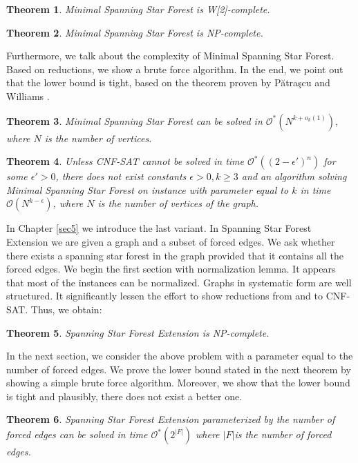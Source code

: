 \documentclass[en]{pracamgr}
\newtheorem{theorem}{Theorem}
\theoremstyle{definition}
\newcommand{\mssfp}{{\sc Minimal Spanning Star Forest}}
\newcommand{\ssfep}{{\sc Spanning Star Forest Extension}}
\newcommand{\cnfsat}{{\sc CNF-SAT}}
\begin{document}
\begin{theorem}\label{thm-mssfp-w2c}
	\mssfp{} is \textup{W[2]}-complete.
\end{theorem}

\begin{theorem}\label{thm-mssfp-npc}
	\mssfp{} is \textup{NP-complete}.
\end{theorem}

\noindent
Furthermore, we talk about the complexity of \mssfp{}. Based on reductions, we show a brute force algorithm. In the end, we point out that the lower bound is tight, based on the theorem proven by Pătraşcu and Williams \cite{DomSet}. 

\begin{theorem}\label{thm-mssfp-time}
	\mssfp{} can be solved in $\mathcal{O}^*(N^{k + o_k(1)})$, where $N$ is the number of vertices.
\end{theorem}

\begin{theorem}\label{thm-mssfp-lowerbound}
	Unless \cnfsat{} cannot be solved in time $\mathcal{O}^*((2-\epsilon')^n)$ for some $\epsilon' > 0$, there does not exist constants $\epsilon > 0,k\geq 3$ and an algorithm solving \mssfp{} on instance with parameter equal to $k$ in time $\mathcal{O}(N^{k-\epsilon})$, where $N$ is the number of vertices of the graph.
\end{theorem}

In Chapter \ref{sec5} we introduce the last variant. In \ssfep{} we are given a graph and a subset of forced edges. We ask whether there exists a spanning star forest in the graph provided that it contains all the forced edges. We begin the first section with normalization lemma. It appears that most of the instances can be normalized. Graphs in systematic form are well structured. It significantly lessen the effort to show reductions from and to \cnfsat{}. Thus, we obtain:

\begin{theorem}\label{thm-ssfep-npc}
	\ssfep{} is \textup{NP}-complete.
\end{theorem}

\noindent
In the next section, we consider the above problem with a parameter equal to the number of forced edges. We prove the lower bound stated in the next theorem by showing a simple brute force algorithm. Moreover, we show that the lower bound is tight and plausibly, there does not exist a better one.

\begin{theorem}\label{thm-ssfep-fe-time}
	\ssfep{} parameterized by the number of forced edges can be solved in time $\mathcal{O}^*(2^{|F|})$ where $|F|$is the number of forced edges.
\end{theorem}
\end{document}
